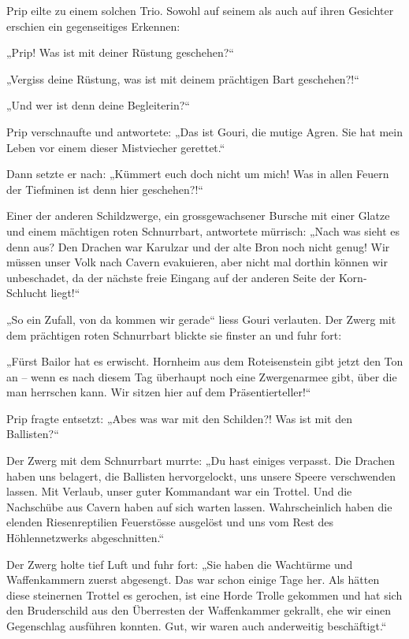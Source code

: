Prip eilte zu einem solchen Trio. Sowohl auf seinem als auch auf ihren Gesichter erschien ein gegenseitiges Erkennen:

„Prip! Was ist mit deiner Rüstung geschehen?“

„Vergiss deine Rüstung, was ist mit deinem prächtigen Bart geschehen?!“

„Und wer ist denn deine Begleiterin?“

Prip verschnaufte und antwortete: „Das ist Gouri, die mutige Agren. Sie hat mein Leben vor einem dieser Mistviecher gerettet.“

Dann setzte er nach: „Kümmert euch doch nicht um mich! Was in allen Feuern der Tiefminen ist denn hier geschehen?!“

Einer der anderen Schildzwerge, ein grossgewachsener Bursche mit einer Glatze und einem mächtigen roten Schnurrbart, antwortete mürrisch: „Nach was sieht es denn aus? Den Drachen war Karulzar und der alte Bron noch nicht genug! Wir müssen unser Volk nach Cavern evakuieren, aber nicht mal dorthin können wir unbeschadet, da der nächste freie Eingang auf der anderen Seite der Korn-Schlucht liegt!“

„So ein Zufall, von da kommen wir gerade“ liess Gouri verlauten. Der Zwerg mit dem prächtigen roten Schnurrbart blickte sie finster an und fuhr fort:

„Fürst Bailor hat es erwischt. Hornheim aus dem Roteisenstein gibt jetzt den Ton an – wenn es nach diesem Tag überhaupt noch eine Zwergenarmee gibt, über die man herrschen kann. Wir sitzen hier auf dem Präsentierteller!“

Prip fragte entsetzt: „Abes was war mit den Schilden?! Was ist mit den Ballisten?“

Der Zwerg mit dem Schnurrbart murrte: „Du hast einiges verpasst. Die Drachen haben uns belagert, die Ballisten hervorgelockt, uns unsere Speere verschwenden lassen. Mit Verlaub, unser guter Kommandant war ein Trottel. Und die Nachschübe aus Cavern haben auf sich warten lassen. Wahrscheinlich haben die elenden Riesenreptilien Feuerstösse ausgelöst und uns vom Rest des Höhlennetzwerks abgeschnitten.“

Der Zwerg holte tief Luft und fuhr fort: „Sie haben die Wachtürme und Waffenkammern zuerst abgesengt. Das war schon einige Tage her. Als hätten diese steinernen Trottel es gerochen, ist eine Horde Trolle gekommen und hat sich den Bruderschild aus den Überresten der Waffenkammer gekrallt, ehe wir einen Gegenschlag ausführen konnten. Gut, wir waren auch anderweitig beschäftigt.“


